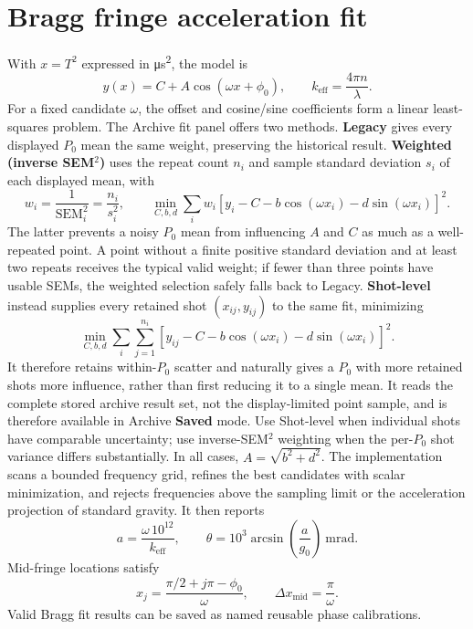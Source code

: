 \documentclass[11pt,oneside,openany]{book}
\newcommand{\ui}[1]{\textbf{#1}}
\begin{document}
\section{Bragg fringe acceleration fit}
With $x=T^2$ expressed in \si{\micro\second\squared}, the model is
\begin{equation}
  y(x)=C+A\cos(\omega x+\phi_0),\qquad
  k_{\mathrm{eff}}=\frac{4\pi n}{\lambda}.
\end{equation}
For a fixed candidate $\omega$, the offset and cosine/sine coefficients form a linear
least-squares problem. The Archive fit panel offers two methods. \ui{Legacy} gives every
displayed $P_0$ mean the same weight, preserving the historical result. \ui{Weighted
(inverse SEM$^2$)} uses the repeat count $n_i$ and sample standard deviation $s_i$ of
each displayed mean, with
\begin{equation}
  w_i=\frac{1}{\operatorname{SEM}_i^2}=\frac{n_i}{s_i^2},
  \qquad \min_{C,b,d}\sum_i w_i\left[y_i-C-b\cos(\omega x_i)-d\sin(\omega x_i)\right]^2 .
\end{equation}
The latter prevents a noisy $P_0$ mean from influencing $A$ and $C$ as much as a
well-repeated point. A point without a finite positive standard deviation and at least two
repeats receives the typical valid weight; if fewer than three points have usable SEMs,
the weighted selection safely falls back to Legacy. \ui{Shot-level} instead supplies every
retained shot $(x_{ij},y_{ij})$ to the same fit, minimizing
\begin{equation}
  \min_{C,b,d}\sum_i\sum_{j=1}^{n_i}
  \left[y_{ij}-C-b\cos(\omega x_i)-d\sin(\omega x_i)\right]^2 .
\end{equation}
It therefore retains within-$P_0$ scatter and naturally gives a $P_0$ with more retained
shots more influence, rather than first reducing it to a single mean. It reads the complete
stored archive result set, not the display-limited point sample, and is therefore available
in Archive \ui{Saved} mode. Use Shot-level when individual shots have comparable uncertainty;
use inverse-SEM$^2$ weighting when the
per-$P_0$ shot variance differs substantially. In all cases,
$A=\sqrt{b^2+d^2}$. The implementation scans a bounded frequency grid, refines the best
candidates with scalar minimization, and rejects frequencies above the sampling limit or
the acceleration projection of standard gravity. It then reports
\begin{equation}
  a=\frac{\omega\,10^{12}}{k_{\mathrm{eff}}},\qquad
  \theta=10^3\arcsin\!\left(\frac{a}{g_0}\right)\ \mathrm{mrad}.
\end{equation}
Mid-fringe locations satisfy
\begin{equation}
  x_j=\frac{\pi/2+j\pi-\phi_0}{\omega},\qquad
  \Delta x_{\mathrm{mid}}=\frac{\pi}{\omega}.
\end{equation}
Valid Bragg fit results can be saved as named reusable phase calibrations.
\end{document}
